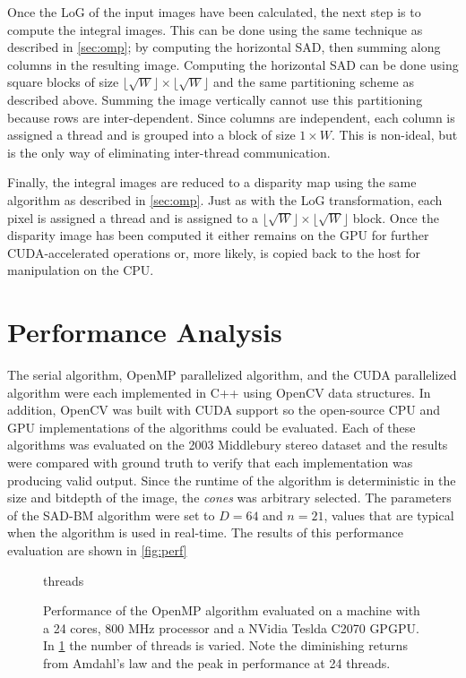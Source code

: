 \documentclass{article}
\let\orgautoref\autoref
\providecommand{\Autoref}
        {\def\equationautorefname{Equation}%
         \def\figureautorefname{Figure}%
         \def\subfigureautorefname{Figure}%
         \def\Itemautorefname{Item}%
         \def\tableautorefname{Table}%
         \def\sectionautorefname{Section}%
         \def\subsectionautorefname{Section}%
         \def\subsubsectionautorefname{Section}%
         \def\chapterautorefname{Section}%
         \def\partautorefname{Part}%
         \orgautoref}
\newcommand{\floor}[1]{\lfloor#1\rfloor}
\begin{document}
Once the LoG of the input images have been calculated, the next step is to
compute the integral images. This can be done using the same technique as
described in \Autoref{sec:omp}; by computing the horizontal SAD, then summing
along columns in the resulting image. Computing the horizontal SAD can be done
using square blocks of size $\floor{\sqrt{W}} \times \floor{\sqrt{W}}$ and the
same partitioning scheme as described above. Summing the image vertically
cannot use this partitioning because rows are inter-dependent. Since columns
are independent, each column is assigned a thread and is grouped into a block
of size $1 \times W$. This is non-ideal, but is the only way of eliminating
inter-thread communication.

Finally, the integral images are reduced to a disparity map using the same
algorithm as described in \Autoref{sec:omp}. Just as with the LoG
transformation, each pixel is assigned a thread and is assigned to a
$\floor{\sqrt{W}} \times \floor{\sqrt{W}}$ block. Once the disparity image has
been computed it either remains on the GPU for further CUDA-accelerated
operations or, more likely, is copied back to the host for manipulation on the
CPU.

\section{Performance Analysis}
\label{sec:perf}
The serial algorithm, OpenMP parallelized algorithm, and the CUDA parallelized
algorithm were each implemented in C++ using OpenCV data structures. In
addition, OpenCV was built with CUDA support so the open-source CPU and GPU
implementations of the algorithms could be evaluated. Each of these algorithms
was evaluated on the 2003 Middlebury stereo dataset and the results were
compared with ground truth to verify that each implementation was producing
valid output. Since the runtime of the algorithm is deterministic in the size
and bitdepth of the image, the \textit{cones} was arbitrary selected. The
parameters of the SAD-BM algorithm were set to $D = 64$ and $n = 21$, values
that are typical when the algorithm is used in real-time. The results of this
performance evaluation are shown in \Autoref{fig:perf}

\begin{figure}
    \centering
    {threads}
    \caption{
        Performance of the OpenMP algorithm evaluated on a machine with a 24
        cores, 800 MHz processor and a NVidia Teslda C2070 GPGPU. In
        \ref{fig:perf-omp} the number of threads is varied. Note the
        diminishing returns from Amdahl's law and the peak in performance at 24
        threads.
    }
    \label{fig:perf-omp}
\end{figure}
\end{document}
